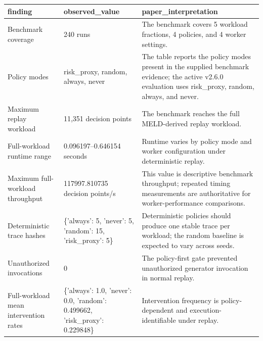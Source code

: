 \begin{tabular}{lll}
\toprule
finding & observed\_value & paper\_interpretation \\
\midrule
Benchmark coverage & 240 runs & The benchmark covers 5 workload fractions, 4 policies, and 4 worker settings. \\
Policy modes & risk\_proxy, random, always, never & The table reports the policy modes present in the supplied benchmark evidence; the active v2.6.0 evaluation uses risk\_proxy, random, always, and never. \\
Maximum replay workload & 11,351 decision points & The benchmark reaches the full MELD-derived replay workload. \\
Full-workload runtime range & 0.096197–0.646154 seconds & Runtime varies by policy mode and worker configuration under deterministic replay. \\
Maximum full-workload throughput & 117997.810735 decision points/s & This value is descriptive benchmark throughput; repeated timing measurements are authoritative for worker-performance comparisons. \\
Deterministic trace hashes & \{'always': 5, 'never': 5, 'random': 15, 'risk\_proxy': 5\} & Deterministic policies should produce one stable trace per workload; the random baseline is expected to vary across seeds. \\
Unauthorized invocations & 0 & The policy-first gate prevented unauthorized generator invocation in normal replay. \\
Full-workload mean intervention rates & \{'always': 1.0, 'never': 0.0, 'random': 0.499662, 'risk\_proxy': 0.229848\} & Intervention frequency is policy-dependent and execution-identifiable under replay. \\
\bottomrule
\end{tabular}
